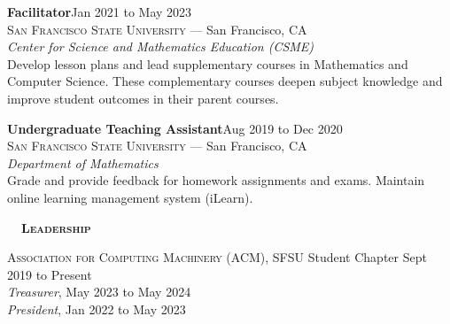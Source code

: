 \documentclass[hidelinks, 10pt]{article}
\def\contentwidth{0.9\linewidth}    %
\def\contentblockspacing{2.5mm}     %
\def\contentheaderspacing{1mm}      %
\def\sectionspacing{8mm}            %
\def\sectiontocontentspacing{4mm}   %
\renewcommand{\section}[1]{
    {\fontsize{14}{14}\selectfont \textsc{\textbf{\ \ #1\ \ }}}\hrulefill
}
\begin{document}
{\vspace{\contentblockspacing}

\begin{minipage}[ct]{\contentwidth}
    \textbf{Facilitator}\hfill Jan 2021 to May 2023\\
    {\textsc{San Francisco State University} --- San Francisco, CA}\\
    \textit{Center for Science and Mathematics Education (CSME)}
    \vspace{\contentheaderspacing}\\
    Develop lesson plans and lead supplementary courses in Mathematics and Computer Science.  These complementary courses deepen subject
    knowledge and improve student outcomes in their parent courses.
\end{minipage}

\vspace{\contentblockspacing}

\begin{minipage}[ct]{\contentwidth}
    \textbf{Undergraduate Teaching Assistant}\hfill Aug 2019 to Dec 2020\\
    {\textsc{San Francisco State University} --- San Francisco, CA}\\
    \textit{Department of Mathematics}\\
    Grade and provide feedback for homework assignments and exams.  Maintain online learning management system (iLearn).
\end{minipage}

\vspace{\sectionspacing}


\section{Leadership}

\vspace{\sectiontocontentspacing}

\begin{minipage}[ct]{\contentwidth}
    \textsc{Association for Computing Machinery} (ACM), SFSU Student Chapter\hfill
    Sept 2019 to Present\\
    \emph{Treasurer}, May 2023 to May 2024\\
    \emph{President}, Jan 2022 to May 2023
\end{minipage}

}
\end{document}
